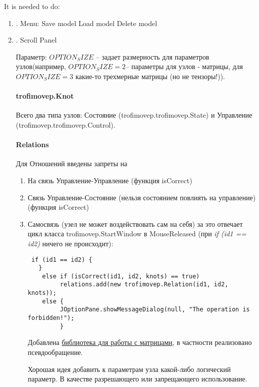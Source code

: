 \documentclass{article}
\begin{document}
\pagestyle{empty}

It is needed to do:
\begin{enumerate}
\item{.} Menu:
 Save model
 Load model
 Delete model

\item{.}  Scroll Panel

Параметр: $OPTION_SIZE$ -- задает размерность для параметров узлов(например, $OPTION_SIZE = 2$-- параметры для узлов - матрицы, для $OPTION_SIZE = 3$ какие-то трехмерные матрицы (но не тензоры!)).

\paragraph{trofimovep.Knot}
Всего два типа узлов: Состояние (trofimovep.trofimovep.State) и Управление (trofimovep.trofimovep.Control).


\paragraph{Relations} 
Для Отношений введены запреты на 
\begin{enumerate}
\item На связь Управление-Управление (функция isCorrect)
\item Связь Управление-Состояние (нельзя состоянием повлиять на управление) (функция isCorrect)
\item Самосвязь (узел не может воздействовать сам на себя) за это отвечает цикл класса trofimovep.StartWindow
в MouseReleased (при {\it{if (id1 == id2)}} ничего не происходит):
\begin{verbatim}
 if (id1 == id2) {
   }
    else if (isCorrect(id1, id2, knots) == true)
         relations.add(new trofimovep.Relation(id1, id2, knots));
    else {
         JOptionPane.showMessageDialog(null, "The operation is forbidden!");
         }
\end{verbatim}

Добавлена \href{http://javadox.com/com.googlecode.efficient-java-matrix-library/ejml/0.23/org/ejml/alg/dense/linsol/svd/SolvePseudoInverseSvd.html}{библиотека для работы с матрицами}, в частности реализовано псевдообращение.

Хорошая идея добавить к параметрам узла какой-либо логический параметр. В качестве разрешающего или запрещающего использование.

\end{enumerate}



\end{enumerate}
\end{document}
